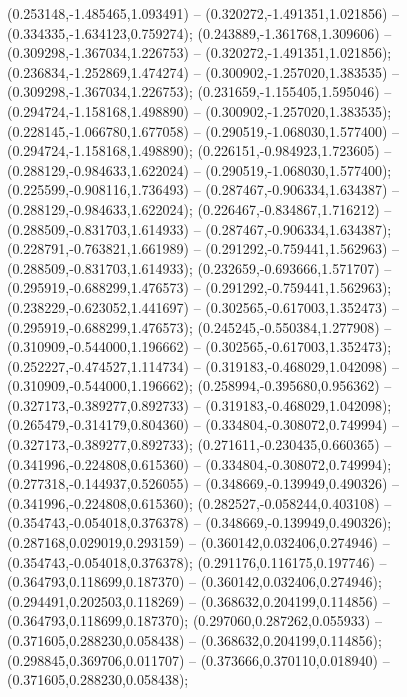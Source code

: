  (0.253148,-1.485465,1.093491) -- (0.320272,-1.491351,1.021856) -- (0.334335,-1.634123,0.759274);
 (0.243889,-1.361768,1.309606) -- (0.309298,-1.367034,1.226753) -- (0.320272,-1.491351,1.021856);
 (0.236834,-1.252869,1.474274) -- (0.300902,-1.257020,1.383535) -- (0.309298,-1.367034,1.226753);
 (0.231659,-1.155405,1.595046) -- (0.294724,-1.158168,1.498890) -- (0.300902,-1.257020,1.383535);
 (0.228145,-1.066780,1.677058) -- (0.290519,-1.068030,1.577400) -- (0.294724,-1.158168,1.498890);
 (0.226151,-0.984923,1.723605) -- (0.288129,-0.984633,1.622024) -- (0.290519,-1.068030,1.577400);
 (0.225599,-0.908116,1.736493) -- (0.287467,-0.906334,1.634387) -- (0.288129,-0.984633,1.622024);
 (0.226467,-0.834867,1.716212) -- (0.288509,-0.831703,1.614933) -- (0.287467,-0.906334,1.634387);
 (0.228791,-0.763821,1.661989) -- (0.291292,-0.759441,1.562963) -- (0.288509,-0.831703,1.614933);
 (0.232659,-0.693666,1.571707) -- (0.295919,-0.688299,1.476573) -- (0.291292,-0.759441,1.562963);
 (0.238229,-0.623052,1.441697) -- (0.302565,-0.617003,1.352473) -- (0.295919,-0.688299,1.476573);
 (0.245245,-0.550384,1.277908) -- (0.310909,-0.544000,1.196662) -- (0.302565,-0.617003,1.352473);
 (0.252227,-0.474527,1.114734) -- (0.319183,-0.468029,1.042098) -- (0.310909,-0.544000,1.196662);
 (0.258994,-0.395680,0.956362) -- (0.327173,-0.389277,0.892733) -- (0.319183,-0.468029,1.042098);
 (0.265479,-0.314179,0.804360) -- (0.334804,-0.308072,0.749994) -- (0.327173,-0.389277,0.892733);
 (0.271611,-0.230435,0.660365) -- (0.341996,-0.224808,0.615360) -- (0.334804,-0.308072,0.749994);
 (0.277318,-0.144937,0.526055) -- (0.348669,-0.139949,0.490326) -- (0.341996,-0.224808,0.615360);
 (0.282527,-0.058244,0.403108) -- (0.354743,-0.054018,0.376378) -- (0.348669,-0.139949,0.490326);
 (0.287168,0.029019,0.293159) -- (0.360142,0.032406,0.274946) -- (0.354743,-0.054018,0.376378);
 (0.291176,0.116175,0.197746) -- (0.364793,0.118699,0.187370) -- (0.360142,0.032406,0.274946);
 (0.294491,0.202503,0.118269) -- (0.368632,0.204199,0.114856) -- (0.364793,0.118699,0.187370);
 (0.297060,0.287262,0.055933) -- (0.371605,0.288230,0.058438) -- (0.368632,0.204199,0.114856);
 (0.298845,0.369706,0.011707) -- (0.373666,0.370110,0.018940) -- (0.371605,0.288230,0.058438);

